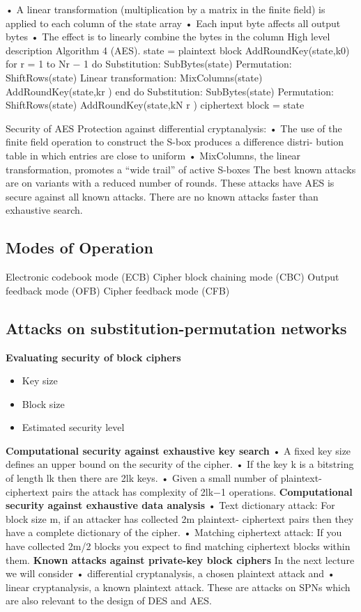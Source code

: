 • A linear transformation (multiplication by a matrix in the finite field) is applied to each column of the state array
• Each input byte affects all output bytes
• The effect is to linearly combine the bytes in the column
High level description
Algorithm 4 (AES). state = plaintext block AddRoundKey(state,k0)
for r = 1 to Nr − 1 do
Substitution: SubBytes(state) Permutation: ShiftRows(state)
Linear transformation: MixColumns(state)
AddRoundKey(state,kr ) end do
Substitution: SubBytes(state) Permutation: ShiftRows(state) AddRoundKey(state,kN r )
ciphertext block = state

Security of AES
Protection against differential cryptanalysis:
• The use of the finite field operation to construct the S-box produces a difference distri- bution table in which entries are close to uniform
• MixColumns, the linear transformation, promotes a “wide trail” of active S-boxes
The best known attacks are on variants with a reduced number of rounds. These attacks have
AES is secure against all known attacks. There are no known attacks faster than
exhaustive search.

\subsection{Modes of Operation}
Electronic codebook mode (ECB)
Cipher block chaining mode (CBC)
Output feedback mode (OFB)
Cipher feedback mode (CFB)

\subsection{Attacks on substitution-permutation networks}
\textbf{Evaluating security of block ciphers}
\begin{itemize}
    \item Key size
    \item Block size
    \item Estimated security level
\end{itemize}
\textbf{Computational security against exhaustive key search}
• A fixed key size defines an upper bound on the security of the cipher.
• If the key k is a bitstring of length lk then there are 2lk keys.
• Given a small number of plaintext-ciphertext pairs the attack has complexity of 2lk−1 operations.
\textbf{Computational security against exhaustive data analysis}
• Text dictionary attack: For block size m, if an attacker has collected 2m plaintext-
ciphertext pairs then they have a complete dictionary of the cipher.
• Matching ciphertext attack: If you have collected 2m/2 blocks you expect to find matching ciphertext blocks within them.
\textbf{Known attacks against private-key block ciphers}
In the next lecture we will consider
• differential cryptanalysis, a chosen plaintext attack and
• linear cryptanalysis, a known plaintext attack.
These are attacks on SPNs which are also relevant to the design of DES and AES.

